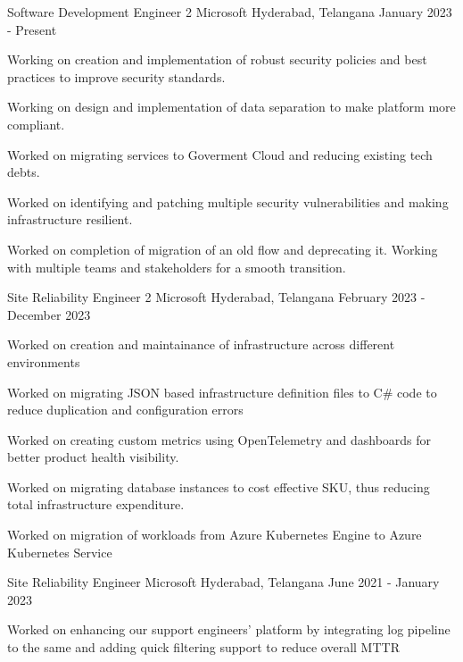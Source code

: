 
\begin{cventries}
  \cventry
  { Software Development Engineer 2}
  {Microsoft}
  {Hyderabad, Telangana}
  { January 2023 - Present}
  {
  \begin{cvitems}
      \item {Working on creation and implementation of robust security policies and best practices to improve security standards.}
      \item {Working on design and implementation of data separation to make platform more compliant.}
      \item {Worked on migrating services to Goverment Cloud and reducing existing tech debts.}
      \item {Worked on identifying and patching multiple security vulnerabilities and making infrastructure resilient.}
      \item {Worked on completion of migration of an old flow and deprecating it. Working with multiple teams and stakeholders for a smooth transition.}
  \end{cvitems}
  }
  \cventry
  {Site Reliability Engineer 2} %
  {Microsoft} %
  {Hyderabad, Telangana} %
  {February 2023 - December 2023} %
  {
  \begin{cvitems} %
  \item {Worked on creation and maintainance of infrastructure across different environments}  
  \item {Worked on migrating JSON based infrastructure definition files to C\# code to reduce duplication and configuration errors}
  \item {Worked on creating custom metrics using OpenTelemetry and dashboards for better product health visibility.}
  \item {Worked on migrating database instances to cost effective SKU, thus reducing total infrastructure expenditure.}
  \item {Worked on migration of workloads from Azure Kubernetes Engine to Azure Kubernetes Service}
  \end{cvitems}
  }
  \cventry
  {Site Reliability Engineer} %
  {Microsoft} %
  {Hyderabad, Telangana} %
  {June 2021 - January 2023} %
  {
  \begin{cvitems} %
  \item {Worked on enhancing our support engineers' platform by integrating log pipeline to the same and adding quick filtering support to reduce overall MTTR}

\end{cvitems}}
\end{cventries}
